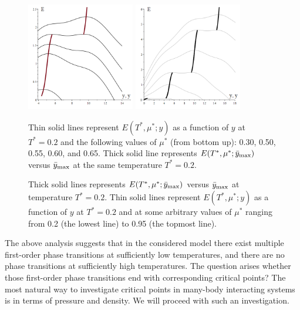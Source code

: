 \documentclass[12pt]{article}
\numberwithin{equation}{section}
\begin{document}
	\begin{figure}[htbp]
		\includegraphics[width=0.42\textwidth,angle=0]{images/EvsYvs_barY_b3}
		\hfill
		\includegraphics[width=0.42\textwidth,angle=0]{images/EvsYvs_barY_b4}
		\vfill
		\parbox{0.45\textwidth}{\caption{\label{fig:EvsYvs_barY_b3} Thin solid lines represent $E(T^*,\mu^*;y)$ as a function of $y$ at $T^*=0.2$ and the following values of $\mu^*$ (from bottom up): 0.30, 0.50, 0.55, 0.60, and 0.65. Thick solid line represents $E(T^*,\mu^*;\bar{y}_{\rm max})$ versus $\bar{y}_{\rm max}$ at the same temperature $T^* = 0.2$.}}
		\hfill
		\parbox{0.45\textwidth}{\caption{\label{fig:EvsYvs_barY_b4} Thick solid lines represents $E(T^*,\mu^*;\bar{y}_{\rm max})$ versus $\bar{y}_{\rm max}$ at temperature $T^* = 0.2$. Thin solid lines represent $E(T^*,\mu^*;y)$ as a function of $y$ at $T^*=0.2$ and at some arbitrary values of $\mu^*$ ranging from 0.2 (the lowest line) to 0.95 (the topmost line).}}
		
	\end{figure}
	
	The above analysis suggests that in the considered model there exist multiple first-order phase transitions at sufficiently low temperatures, and there are no phase transitions at sufficiently high temperatures. The question arises whether those first-order phase transitions end with corresponding critical points? The most natural way to investigate critical points in many-body interacting systems is in terms of pressure and density. We will proceed with such an investigation.
	
\end{document}
